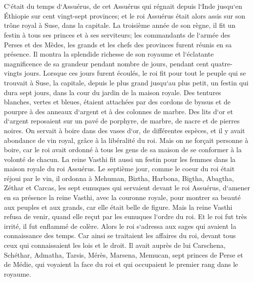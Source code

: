 

\chapter{}

\verse C`était du temps d`Assuérus, de cet Assuérus qui régnait depuis l`Inde jusqu`en Éthiopie sur cent vingt-sept provinces; 
\verse et le roi Assuérus était alors assis sur son trône royal à Suse, dans la capitale. 
\verse La troisième année de son règne, il fit un festin à tous ses princes et à ses serviteurs; les commandants de l`armée des Perses et des Mèdes, les grands et les chefs des provinces furent réunis en sa présence. 
\verse Il montra la splendide richesse de son royaume et l`éclatante magnificence de sa grandeur pendant nombre de jours, pendant cent quatre-vingts jours. 
\verse Lorsque ces jours furent écoulés, le roi fit pour tout le peuple qui se trouvait à Suse, la capitale, depuis le plus grand jusqu`au plus petit, un festin qui dura sept jours, dans la cour du jardin de la maison royale. 
\verse Des tentures blanches, vertes et bleues, étaient attachées par des cordons de byssus et de pourpre à des anneaux d`argent et à des colonnes de marbre. Des lits d`or et d`argent reposaient sur un pavé de porphyre, de marbre, de nacre et de pierres noires. 
\verse On servait à boire dans des vases d`or, de différentes espèces, et il y avait abondance de vin royal, grâce à la libéralité du roi. 
\verse Mais on ne forçait personne à boire, car le roi avait ordonné à tous les gens de sa maison de se conformer à la volonté de chacun. 
\verse La reine Vasthi fit aussi un festin pour les femmes dans la maison royale du roi Assuérus. 
\verse Le septième jour, comme le coeur du roi était réjoui par le vin, il ordonna à Mehuman, Biztha, Harbona, Bigtha, Abagtha, Zéthar et Carcas, les sept eunuques qui servaient devant le roi Assuérus, 
\verse d`amener en sa présence la reine Vasthi, avec la couronne royale, pour montrer sa beauté aux peuples et aux grands, car elle était belle de figure. 
\verse Mais la reine Vasthi refusa de venir, quand elle reçut par les eunuques l`ordre du roi. Et le roi fut très irrité, il fut enflammé de colère. 
\verse Alors le roi s`adressa aux sages qui avaient la connaissance des temps. Car ainsi se traitaient les affaires du roi, devant tous ceux qui connaissaient les lois et le droit. 
\verse Il avait auprès de lui Carschena, Schéthar, Admatha, Tarsis, Mérès, Marsena, Memucan, sept princes de Perse et de Médie, qui voyaient la face du roi et qui occupaient le premier rang dans le royaume. 
